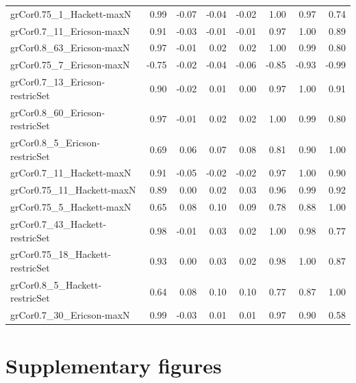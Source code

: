 {\begin{landscape}
\begin{footnotesize}
\begin{longtable}{@{}l|rrrrrrr@{}}
grCor0.75\_1\_Hackett-maxN        & 0.99 & -0.07 & -0.04 & -0.02 & 1.00 & 0.97 & 0.74\tabularnewline
grCor0.7\_11\_Ericson-maxN        & 0.91 & -0.03 & -0.01 & -0.01 & 0.97 & 1.00 & 0.89\tabularnewline
grCor0.8\_63\_Ericson-maxN        & 0.97 & -0.01 & 0.02 & 0.02 & 1.00 & 0.99 & 0.80\tabularnewline
grCor0.75\_7\_Ericson-maxN        & -0.75 & -0.02 & -0.04 & -0.06 & -0.85 & -0.93 & -0.99\tabularnewline
grCor0.7\_13\_Ericson-restricSet  & 0.90 & -0.02 & 0.01 & 0.00 & 0.97 & 1.00 & 0.91\tabularnewline
grCor0.8\_60\_Ericson-restricSet  & 0.97 & -0.01 & 0.02 & 0.02 & 1.00 & 0.99 & 0.80\tabularnewline
grCor0.8\_5\_Ericson-restricSet   & 0.69 & 0.06 & 0.07 & 0.08 & 0.81 & 0.90 & 1.00\tabularnewline
grCor0.7\_11\_Hackett-maxN        & 0.91 & -0.05 & -0.02 & -0.02 & 0.97 & 1.00 & 0.90\tabularnewline
grCor0.75\_11\_Hackett-maxN       & 0.89 & 0.00 & 0.02 & 0.03 & 0.96 & 0.99 & 0.92\tabularnewline
grCor0.75\_5\_Hackett-maxN        & 0.65 & 0.08 & 0.10 & 0.09 & 0.78 & 0.88 & 1.00\tabularnewline
grCor0.7\_43\_Hackett-restricSet  & 0.98 & -0.01 & 0.03 & 0.02 & 1.00 & 0.98 & 0.77\tabularnewline
grCor0.75\_18\_Hackett-restricSet & 0.93 & 0.00 & 0.03 & 0.02 & 0.98 & 1.00 & 0.87\tabularnewline
grCor0.8\_5\_Hackett-restricSet   & 0.64 & 0.08 & 0.10 & 0.10 & 0.77 & 0.87 & 1.00\tabularnewline
grCor0.7\_30\_Ericson-maxN        & 0.99 & -0.03 & 0.01 & 0.01 & 0.97 & 0.90 & 0.58\tabularnewline
\bottomrule
\end{longtable}
\end{footnotesize}
\end{landscape}
}

\clearpage%


\section*{Supplementary figures}


